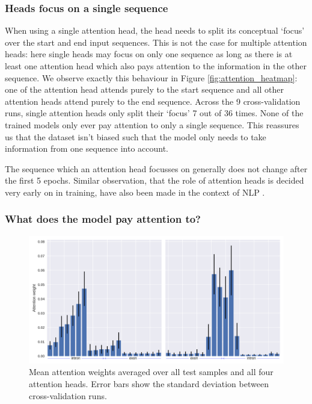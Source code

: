 
\subsubsection{Heads focus on a single sequence} 
When using a single attention head, the head needs to split its conceptual `focus' over the start and end input sequences. This is not the case for multiple attention heads: here single heads may focus on only one sequence as long as there is at least one attention head which also pays attention to the information in the other sequence. We observe exactly this behaviour in Figure \ref{fig:attention_heatmap}: one of the attention head attends purely to the start sequence and all other attention heads attend purely to the end sequence. Across the 9 cross-validation runs, single attention heads only split their `focus' 7 out of 36 times. None of the trained models only ever pay attention to only a single sequence. This reassures us that the dataset isn't biased such that the model only needs to take information from one sequence into account. 

The sequence which an attention head focusses on generally does not change after the first 5 epochs. Similar observation, that the role of attention heads is decided very early on in training, have also been made in the context of NLP \cite{sixteenheads}.

\subsubsection{What does the model pay attention to?}

\begin{figure}
	\centering\includegraphics[width=1\textwidth]{../visualizations/ch5-results/mean_attention_barchart_zoomed.png}
	\caption{Mean attention weights averaged over all test samples and all four attention heads. Error bars show the standard deviation between cross-validation runs. }
	\label{fig:mean_attn}
\end{figure}

